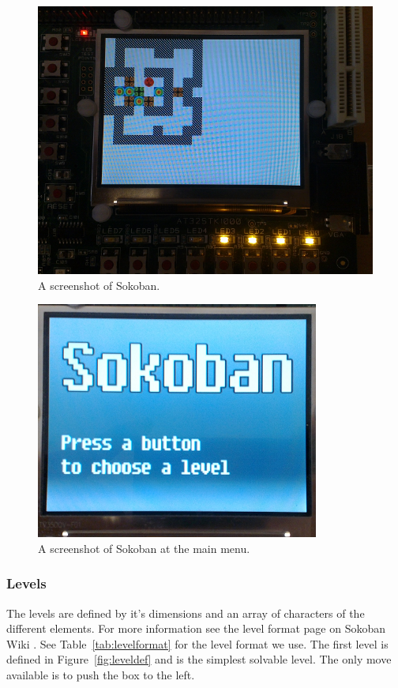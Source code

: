 \documentclass[a4paper,11pt]{article}
\begin{document}
\begin{figure}[H]
\centering
\includegraphics[scale=0.6]{images/sokobanscreen.png}
\caption{A screenshot of Sokoban.}
\label{fig:sokobanscreen}
\end{figure}

\begin{figure}[H]
\centering
\includegraphics[scale=0.6]{images/sokobanmainmenu.png}
\caption{A screenshot of Sokoban at the main menu.}
\label{fig:sokobanmainmenu}
\end{figure}

\subsubsection{Levels}
The levels are defined by it's dimensions and an array of characters of the different elements. For more information see the level format page on Sokoban Wiki \cite{sokobanlevel}. See Table~\ref{tab:levelformat} for the level format we use. The first level is defined in Figure~\ref{fig:leveldef} and is the simplest solvable level. The only move available is to push the box to the left.
\end{document}
